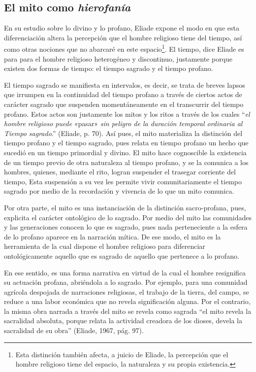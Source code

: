 \begin{refsection}
\section{El mito como \emph{hierofanía}}

En su estudio sobre lo divino y lo profano, Eliade expone el modo en que esta diferenciación altera la percepción que el hombre religioso tiene del tiempo, así como otras nociones que no abarcaré en este espacio\footnote{Esta distinción también afecta, a juicio de Eliade, la percepción que el hombre religioso tiene del espacio, la naturaleza y su propia existencia.}. El tiempo, dice Eliade es para para el hombre religioso heterogéneo y discontinuo, justamente porque existen dos formas de tiempo: el tiempo sagrado y el tiempo profano.

El tiempo sagrado se manifiesta en intervalos, es decir, se trata de breves lapsos que irrumpen en la continuidad del tiempo profano a través de ciertos actos de carácter sagrado que suspenden momentáneamente en el transcurrir del tiempo profano. Estos actos son justamente los mitos y los ritos a través de los cuales ``\emph{el hombre religioso puede} «pasar» \emph{sin peligro de la duración temporal ordinaria al Tiempo sagrado}.'' (Eliade, p. 70). Así pues, el mito materializa la distinción del tiempo profano y el tiempo sagrado, pues relata en tiempo profano un hecho que sucedió en un tiempo primordial y divino. El mito hace cognoscible la existencia de un tiempo previo de otra naturaleza al tiempo profano, y se la comunica a los hombres, quienes, mediante el rito, logran suspender el trasegar corriente del tiempo, Esta suspensión a su vez les permite vivir comunitariamente el tiempo sagrado por medio de la recordación y vivencia de lo que un mito comunica.

Por otra parte, el mito es una instanciación de la distinción sacro-profana, pues, explicita el carácter ontológico de lo sagrado. Por medio del mito las comunidades y las generaciones conocen lo que es sagrado, pues nada perteneciente a la esfera de lo profano aparece en la narración mítica. De ese modo, el mito es la herramienta de la cual dispone el hombre religioso para diferenciar ontológicamente aquello que es sagrado de aquello que pertenece a lo profano.

En ese sentido, es una forma narrativa en virtud de la cual el hombre resignifica su actuación profana, abriéndola a lo sagrado. Por ejemplo, para una comunidad agrícola despojada de narraciones religiosas, el trabajo de la tierra, del campo, se reduce a una labor económica que no revela significación alguna. Por el contrario, la misma obra narrada a través del mito se revela como sagrada ``el mito revela la sacralidad absoluta, porque relata la actividad creadora de los dioses, devela la sacralidad de su obra'' (Eliade, 1967, pág. 97).


\end{refsection}
